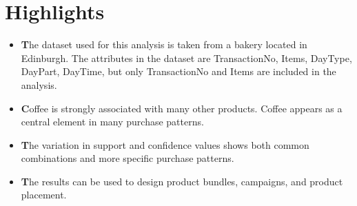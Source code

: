 \chapter*{Highlights}
\label{chap:highlights}
\begin{itemize}
    \item \textbf The dataset used for this analysis is taken from a bakery located in Edinburgh. The attributes in the dataset are TransactionNo, Items, DayType, DayPart, DayTime, but only TransactionNo and Items are included in the analysis.   
    \item \textbf Coffee is strongly associated with many other products. Coffee appears as a central element in many purchase patterns. 
    \item \textbf The variation in support and confidence values shows both common combinations and more specific purchase patterns.  
    \item \textbf The results can be used to design product bundles, campaigns, and product placement.
\end{itemize}